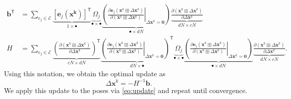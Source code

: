 \documentclass{article}
\newcommand{\transp}{{\scriptstyle{\mathsf{T}}}}
\begin{document}
\begin{align*}
    \mathbf{b}^\transp &= \sum_{e_j \in \mathcal{E}} \underbrace{[ \mathbf{e}_j(\mathbf{x^k}) ]^\transp }_{1 \times \bullet} \underbrace{\Omega_j}_{\bullet \times \bullet} \underbrace{\left( \left. \frac{\partial \mathbf{e}_j(\mathbf{x}^k \boxplus \Delta \mathbf{x}^k)}{\partial (\mathbf{x}^k \boxplus \Delta \mathbf{x}^k)} \right|_{\Delta \mathbf{x}^k = \mathbf{0}} \right)}_{\bullet \times dN} \underbrace{\frac{\partial (\mathbf{x}^k \boxplus \Delta \mathbf{x}^k)}{\partial \Delta \mathbf{x}^k}}_{dN \times cN} \\
    H &= \sum_{e_j \in \mathcal{E}} \underbrace{ \left( \frac{\partial (\mathbf{x}^k \boxplus \Delta \mathbf{x}^k)}{\partial \Delta \mathbf{x}^k} \right)^\transp}_{cN \times dN} \underbrace{\left( \left. \frac{\partial \mathbf{e}_j(\mathbf{x}^k \boxplus \Delta \mathbf{x}^k)}{\partial (\mathbf{x}^k \boxplus \Delta \mathbf{x}^k)} \right|_{\Delta \mathbf{x}^k = \mathbf{0}} \right)^\transp}_{dN \times \bullet} \underbrace{\Omega_j}_{\bullet \times \bullet} \underbrace{\left( \left. \frac{\partial \mathbf{e}_j(\mathbf{x}^k \boxplus \Delta \mathbf{x}^k)}{\partial (\mathbf{x}^k \boxplus \Delta \mathbf{x}^k)} \right|_{\Delta \mathbf{x}^k = \mathbf{0}} \right)}_{\bullet \times dN} \underbrace{\frac{\partial (\mathbf{x}^k \boxplus \Delta \mathbf{x}^k)}{\partial \Delta \mathbf{x}^k}}_{dN \times cN}.
\end{align*}
%
Using this notation, we obtain the optimal update as
%
\begin{equation}
    \Delta \mathbf{x}^k = -H^{-1} \mathbf{b}.  \label{eq:deltax}
\end{equation}
%
We apply this update to the poses via \eqref{eq:update} and repeat until convergence.




{}
\end{document}
